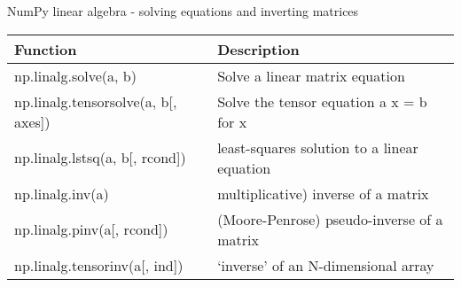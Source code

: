 \documentclass[10pt]{beamer}
\begin{document}
\begin{frame}{NumPy linear algebra - solving equations and inverting matrices}
\begin{table}
\begin{tabular}{ll}
\textbf{Function} & \textbf{Description}  \\
\hline
np.linalg.solve(a, b) 	            &  Solve a linear matrix equation\\
np.linalg.tensorsolve(a, b[, axes]) &	Solve the tensor equation a x = b for x\\
np.linalg.lstsq(a, b[, rcond]) 	    &  least-squares solution to a linear equation\\
np.linalg.inv(a) 	                  & multiplicative) inverse of a matrix\\
np.linalg.pinv(a[, rcond])    	    &  (Moore-Penrose) pseudo-inverse of a matrix\\
np.linalg.tensorinv(a[, ind]) 	    &  ‘inverse’ of an N-dimensional array\\
\end{tabular}
\end{table}
\end{frame}

\end{document}
